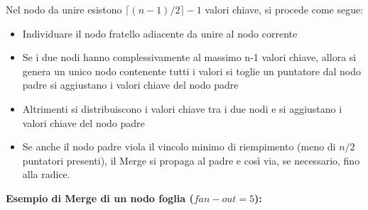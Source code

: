 \documentclass[a4paper, 10pt]{article}
\theoremstyle{definition}
\begin{document}
			Nel nodo da unire esistono $ \lceil (n-1)/2 \rceil -1 $ valori chiave, si procede come
			segue:
			\begin{itemize}
				\item Individuare il nodo fratello adiacente da unire al nodo corrente
				\item Se i due nodi hanno complessivamente al massimo n-1 valori chiave, allora
					\subitem{-} si genera un unico nodo contenente tutti i valori
					\subitem{-} si toglie un puntatore dal nodo padre
					\subitem{-} si aggiustano i valori chiave del nodo padre
				\item Altrimenti si distribuiscono i valori chiave tra i due nodi e si aggiustano i valori
				chiave del nodo padre
				\item Se anche il nodo padre viola il vincolo minimo di riempimento (meno di $ n/2 $
				puntatori presenti), il Merge si propaga al padre e così via, se necessario, fino
				alla radice.
			\end{itemize}
			
			\textbf{Esempio di Merge di un nodo foglia ($ fan-out = 5 $):}
			
			\vspace*{0.3cm}
			
\end{document}
